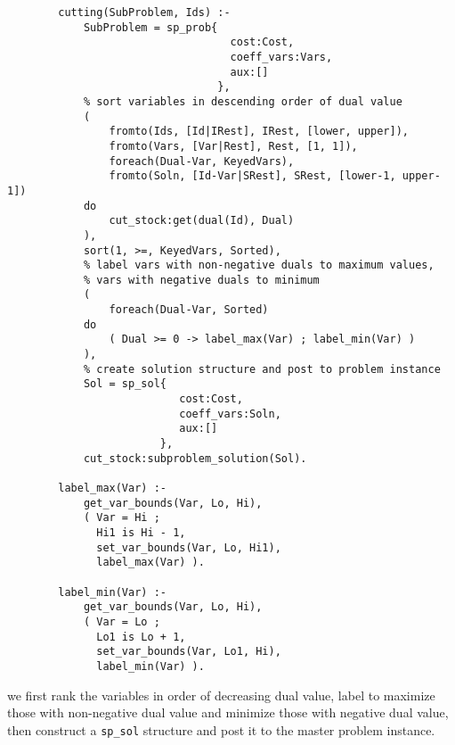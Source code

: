 \begin{verbatim}
        cutting(SubProblem, Ids) :-
            SubProblem = sp_prob{
                                   cost:Cost,
                                   coeff_vars:Vars,
                                   aux:[]
                                 },
            % sort variables in descending order of dual value
            (
                fromto(Ids, [Id|IRest], IRest, [lower, upper]),
                fromto(Vars, [Var|Rest], Rest, [1, 1]),
                foreach(Dual-Var, KeyedVars),
                fromto(Soln, [Id-Var|SRest], SRest, [lower-1, upper-1])
            do
                cut_stock:get(dual(Id), Dual)
            ),
            sort(1, >=, KeyedVars, Sorted),
            % label vars with non-negative duals to maximum values,
            % vars with negative duals to minimum
            (
                foreach(Dual-Var, Sorted)
            do
                ( Dual >= 0 -> label_max(Var) ; label_min(Var) )
            ),
            % create solution structure and post to problem instance
            Sol = sp_sol{
                           cost:Cost,
                           coeff_vars:Soln,
                           aux:[]
                        },                  
            cut_stock:subproblem_solution(Sol).

        label_max(Var) :-
            get_var_bounds(Var, Lo, Hi),
            ( Var = Hi ;
              Hi1 is Hi - 1,
              set_var_bounds(Var, Lo, Hi1),
              label_max(Var) ).

        label_min(Var) :-
            get_var_bounds(Var, Lo, Hi),
            ( Var = Lo ;
              Lo1 is Lo + 1,
              set_var_bounds(Var, Lo1, Hi),
              label_min(Var) ).
\end{verbatim}
we first rank the variables in order of decreasing dual value, label
to maximize those with non-negative dual value and minimize those with
negative dual value, then construct a {\tt sp\_sol} structure and post
it to the master problem instance.
\disableunderscores

